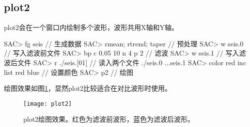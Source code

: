 \subsection{plot2}
plot2会在一个窗口内绘制多个波形，波形共用X轴和Y轴。
\begin{SACCode}
SAC> fg seis                     // 生成数据
SAC> rmean; rtrend; taper        // 预处理
SAC> w seis.0                    // 写入滤波前文件
SAC> bp c 0.05 10 n 4 p 2        // 滤波
SAC> w seis.1                    // 写入滤波后文件
SAC> r ./seis.[01]               // 读入两个文件
./seis.0 ...seis.1
SAC> color red inc list red blue // 设置颜色
SAC> p2                          // 绘图
\end{SACCode}
绘图效果如图\ref{fig:plot2}，显然plot2比较适合在对比波形时使用。

\begin{figure}[H]
\centering
\texttt{[image: plot2]}
\caption[plot2绘图效果]{plot2绘图效果。红色为滤波前波形，蓝色为滤波后波形。}
\label{fig:plot2}
\end{figure}
